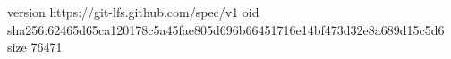 version https://git-lfs.github.com/spec/v1
oid sha256:62465d65ca120178c5a45fae805d696b66451716e14bf473d32e8a689d15c5d6
size 76471
